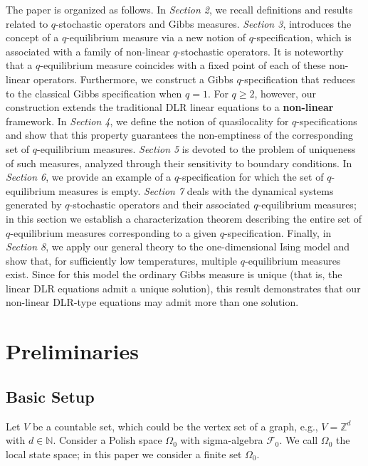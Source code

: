 \documentclass[11pt,reqno]{amsart}
\numberwithin{equation}{section} \setcounter{tocdepth}{1}
\begin{document}
The paper is organized as follows.
In {\it Section 2}, we recall definitions and results related to $q$-stochastic operators and Gibbs measures.
{\it Section 3}, introduces the concept of a $q$-equilibrium measure via a new notion of $q$-specification, which is associated with a family of  non-linear $q$-stochastic operators. It is noteworthy that a $q$-equilibrium measure coincides with a fixed point of each of these non-linear operators. Furthermore, we construct a Gibbs $q$-specification that reduces to the classical Gibbs specification when $q=1$. For $q \ge 2$, however, our construction extends the traditional DLR linear equations to a {\bf non-linear} framework.
In {\it Section 4}, we define the notion of quasilocality for $q$-specifications and show that this property guarantees the non-emptiness of the corresponding set of $q$-equilibrium measures.
{\it Section 5} is devoted to the problem of uniqueness of such measures, 
analyzed through their sensitivity to boundary conditions.
In {\it Section 6}, we provide an example of a $q$-specification for which the set of $q$-equilibrium measures is empty.
{\it Section 7} deals with the dynamical systems generated by $q$-stochastic operators and their associated $q$-equilibrium measures; in this section we establish a characterization theorem describing the entire set of $q$-equilibrium measures corresponding to a given $q$-specification.
Finally, in {\it Section 8}, we apply our general theory to the one-dimensional Ising model and show that, for sufficiently low temperatures, multiple $q$-equilibrium measures exist. Since for this model the ordinary Gibbs measure is unique (that is, the linear DLR equations admit a unique solution), this result demonstrates that our non-linear DLR-type equations may admit more than one solution.

\section{Preliminaries}
	\subsection{Basic Setup} 
	
	Let $V$ be a countable set, which could be the vertex set of a graph, e.g., $V = \mathbb{Z}^d$ with $d \in \mathbb{N}$. 
    Consider  a Polish space $\Omega_0$ with sigma-algebra $\mathcal{F}_0$. We call $\Omega_0$ the local state space; in this paper we consider a finite set $\Omega_0$.
	
\end{document}
